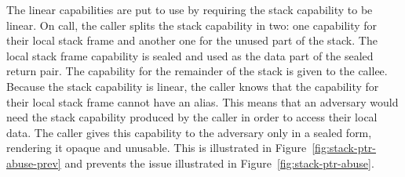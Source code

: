 \documentclass{jfp}
\begin{document}
The linear capabilities are put to use by requiring the stack capability to be linear.
On call, the caller splits the stack capability in two: one capability for their local stack frame and another one for the unused part of the stack.
The local stack frame capability is sealed and used as the data part of the sealed return pair.
The capability for the remainder of the stack is given to the callee.
Because the stack capability is linear, the caller knows that the capability for their local stack frame cannot have an alias.
This means that an adversary would need the stack capability produced by the caller in order to access their local data.
The caller gives this capability to the adversary only in a sealed form, rendering it opaque and unusable.
This is illustrated in Figure~\ref{fig:stack-ptr-abuse-prev} and prevents the issue illustrated in Figure~\ref{fig:stack-ptr-abuse}.
\end{document}
